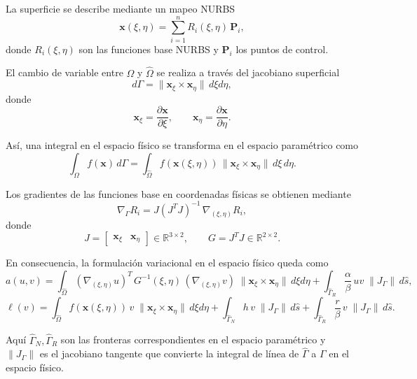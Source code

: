 \documentclass[12pt]{article}
\begin{document}
La superficie se describe mediante un mapeo NURBS
\[
\mathbf{x}(\xi,\eta) = \sum_{i=1}^{n} R_i(\xi,\eta)\, \mathbf{P}_i,
\]
donde $R_i(\xi,\eta)$ son las funciones base NURBS y $\mathbf{P}_i$ los 
puntos de control.

\medskip

El cambio de variable entre $\Omega$ y $\hat{\Omega}$ se realiza a través del 
jacobiano superficial
\[
d\Gamma = \|\mathbf{x}_\xi \times \mathbf{x}_\eta\| \, d\xi d\eta,
\]
donde
\[
\mathbf{x}_\xi = \frac{\partial \mathbf{x}}{\partial \xi}, 
\qquad 
\mathbf{x}_\eta = \frac{\partial \mathbf{x}}{\partial \eta}.
\]

\medskip

Así, una integral en el espacio físico se transforma en el espacio paramétrico como
\[
\int_{\Omega} f(\mathbf{x}) \, d\Gamma 
= \int_{\hat{\Omega}} f(\mathbf{x}(\xi,\eta)) \, \|\mathbf{x}_\xi \times \mathbf{x}_\eta\| \, d\xi \, d\eta.
\]

\medskip

Los gradientes de las funciones base en coordenadas físicas se obtienen mediante
\[
\nabla_\Gamma R_i = J (J^T J)^{-1} \, \nabla_{(\xi,\eta)} R_i,
\]
donde 
\[
J = \begin{bmatrix}
\mathbf{x}_\xi & \mathbf{x}_\eta
\end{bmatrix} \in \mathbb{R}^{3\times 2}, 
\qquad 
G = J^T J \in \mathbb{R}^{2\times 2}.
\]

\medskip

En consecuencia, la formulación variacional en el espacio físico queda como
\[
a(u,v) = \int_{\hat{\Omega}} (\nabla_{(\xi,\eta)} u)^T \, G^{-1}(\xi,\eta) \, (\nabla_{(\xi,\eta)} v) \; \|\mathbf{x}_\xi \times \mathbf{x}_\eta\| \, d\xi d\eta
          + \int_{\hat{\Gamma}_R} \frac{\alpha}{\beta}\, u v \; \|J_\Gamma\| \, d\hat s,
\]
\[
\ell(v) = \int_{\hat{\Omega}} f(\mathbf{x}(\xi,\eta))\, v \; \|\mathbf{x}_\xi \times \mathbf{x}_\eta\| \, d\xi d\eta
          + \int_{\hat{\Gamma}_N} h \, v \; \|J_\Gamma\| \, d\hat s
          + \int_{\hat{\Gamma}_R} \frac{r}{\beta}\, v \; \|J_\Gamma\| \, d\hat s.
\]

Aquí \(\hat{\Gamma}_N, \hat{\Gamma}_R\) son las fronteras correspondientes en el espacio paramétrico y
\(\|J_\Gamma\|\) es el jacobiano tangente que convierte la integral de línea de \(\hat{\Gamma}\) a \(\Gamma\) en el espacio físico.
\end{document}
